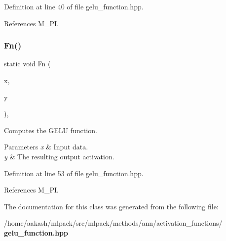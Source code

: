 Definition at line 40 of file gelu\+\_\+function.\+hpp.



References M\+\_\+\+PI.

\mbox{\label{classmlpack_1_1ann_1_1GELUFunction_af6cf5da90eb6312e3e25c9b8bd9c3527}} 
\subsubsection{Fn()\hspace{0.1cm}{\footnotesize\ttfamily [2/2]}}
{\footnotesize\ttfamily static void Fn (\begin{DoxyParamCaption}\item[{const Input\+Vec\+Type \&}]{x,  }\item[{Output\+Vec\+Type \&}]{y }\end{DoxyParamCaption})\hspace{0.3cm}{\ttfamily [inline]}, {\ttfamily [static]}}



Computes the G\+E\+LU function. 


\begin{DoxyParams}{Parameters}
{\em x} & Input data. \\
\hline
{\em y} & The resulting output activation. \\
\hline
\end{DoxyParams}


Definition at line 53 of file gelu\+\_\+function.\+hpp.



References M\+\_\+\+PI.



The documentation for this class was generated from the following file\+:\begin{DoxyCompactItemize}
\item 
/home/aakash/mlpack/src/mlpack/methods/ann/activation\+\_\+functions/\textbf{ gelu\+\_\+function.\+hpp}\end{DoxyCompactItemize}
